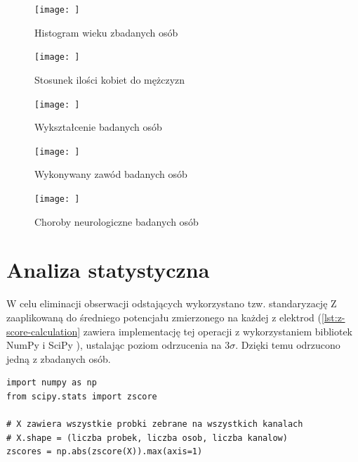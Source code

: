 \documentclass{./assets/wfis}
\begin{document}
\begin{figure}[h!]
    \centering
    \texttt{[image: ]}
    \caption{Histogram wieku zbadanych osób}
    \label{fig:age}
\end{figure}

\begin{figure}[h!]
    \centering
    \texttt{[image: ]}
    \caption{Stosunek ilości kobiet do mężczyzn}
    \label{fig:gender}
\end{figure}

\begin{figure}[h!]
    \centering
    \texttt{[image: ]}
    \caption{Wykształcenie badanych osób}
    \label{fig:education}
\end{figure}

\begin{figure}[h!]
    \centering
    \texttt{[image: ]}
    \caption{Wykonywany zawód badanych osób}
    \label{fig:jobs}
\end{figure}

\begin{figure}[h!]
    \centering
    \texttt{[image: ]}
    \caption{Choroby neurologiczne badanych osób}
    \label{fig:neurological-diseses}
\end{figure}


\section{Analiza statystyczna}\label{analiza-klasyczna}
W celu eliminacji obserwacji odstających wykorzystano tzw. standaryzację Z zaaplikowaną do średniego potencjału zmierzonego na każdej z elektrod (\autoref{lst:z-score-calculation} zawiera implementację tej operacji z wykorzystaniem bibliotek NumPy \cite{harris_array_2020} i SciPy \cite{virtanen_scipy_2020}), ustalając poziom odrzucenia na $3\sigma$. Dzięki temu odrzucono jedną z zbadanych osób.

\begin{lstlisting}[caption={Obliczanie standardyzacji Z},label={lst:z-score-calculation}]
import numpy as np
from scipy.stats import zscore

# X zawiera wszystkie probki zebrane na wszystkich kanalach
# X.shape = (liczba probek, liczba osob, liczba kanalow)
zscores = np.abs(zscore(X)).max(axis=1)
\end{lstlisting}
\end{document}
